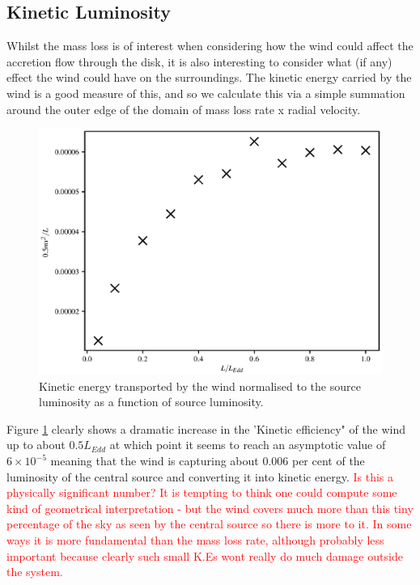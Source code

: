 \documentclass[a4paper,fleqn,usenatbib]{mnras}
\begin{document}
\subsection{Kinetic Luminosity}
Whilst the mass loss is of interest when considering how the wind could affect the 
accretion flow through the disk, it is also interesting to consider what (if any) effect the
wind could have on the surroundings. The kinetic energy carried by the wind is a
good measure of this, and so we calculate this via a simple summation around the outer
edge of the domain of mass loss rate x radial velocity. 




\begin{figure}
\includegraphics[width=\columnwidth]{figures/lum_vs_ke.eps}
\caption{Kinetic energy transported by the wind normalised to the source
luminosity as a function of source luminosity.}
\label{figure:ke_vs_lum}
\end{figure}

Figure \ref{figure:ke_vs_lum} clearly shows a dramatic increase in the 'Kinetic
efficiency" of the wind up to about $0.5L_{Edd}$ at which point it seems to
reach an asymptotic value of $6\times10^{-5}$ meaning that the wind is 
capturing about 0.006 per cent of the luminosity of the central source and converting
it into kinetic energy.
\textcolor{red}{Is this a physically significant number? It is tempting to think one 
could compute some kind of geometrical interpretation - but the wind covers much
more than this tiny percentage of the sky as seen by the central source so there
is more to it. In some ways it is more fundamental than the mass loss rate, although
probably less important because clearly such small K.Es wont really do much damage
outside the system.}
\end{document}
